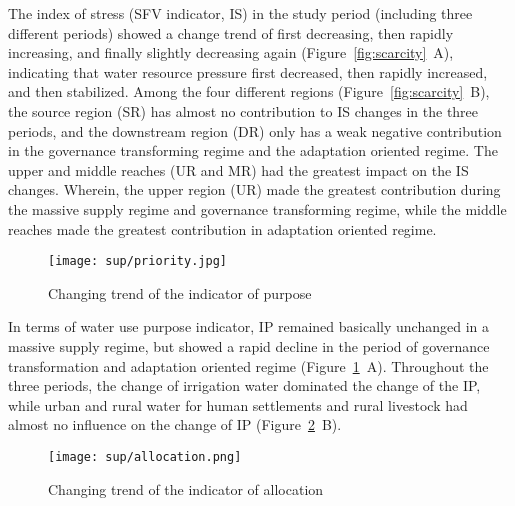 
The index of stress (SFV indicator, IS) in the study period (including three different periods) showed a change trend of first decreasing, then rapidly increasing, and finally slightly decreasing again (Figure~\ref{fig:scarcity}~A), indicating that water resource pressure first decreased, then rapidly increased, and then stabilized.
Among the four different regions (Figure~\ref{fig:scarcity}~B), the source region (SR) has almost no contribution to IS changes in the three periods, and the downstream region (DR) only has a weak negative contribution in the governance transforming regime and the adaptation oriented regime.
The upper and middle reaches (UR and MR) had the greatest impact on the IS changes. Wherein, the upper region (UR) made the greatest contribution during the massive supply regime and governance transforming regime, while the middle reaches made the greatest contribution in adaptation oriented regime.

\begin{figure}[!htb]
    \centering
    \texttt{[image: sup/priority.jpg]}
    \caption{Changing trend of the indicator of purpose}\label{fig:purpose}
\end{figure}

In terms of water use purpose indicator, IP remained basically unchanged in a massive supply regime, but showed a rapid decline in the period of governance transformation and adaptation oriented regime (Figure~\ref{fig:purpose}~A).
Throughout the three periods, the change of irrigation water dominated the change of the IP, while urban and rural water for human settlements and rural livestock had almost no influence on the change of IP (Figure~\ref{fig:allocation}~B).

\begin{figure}[!htb]
    \centering
    \texttt{[image: sup/allocation.png]}
    \caption{Changing trend of the indicator of allocation}\label{fig:allocation}
\end{figure}

